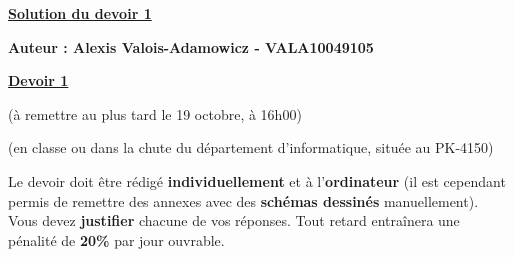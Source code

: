 \documentclass[12pt,addpoints]{exam}
\begin{document}
	
\ifprintanswers
  \vskip 1.2cm
  \centerline{\large\underline{\textbf{Solution du devoir 1}}}
  \vskip 0.5cm
  \begin{mdframed} \begin{center}
  \textbf{Auteur : Alexis Valois-Adamowicz - VALA10049105} \\
  \end{center} \end{mdframed}
  \vskip 0.5cm
\else
  \vskip 1.2cm
  \centerline{\large\underline{\textbf{Devoir 1}}}
  \centerline{\small (à remettre au plus tard le 19 octobre, à 16h00)}
  \centerline{\small (en classe ou dans la chute du département d'informatique, située au PK-4150)}
  \vskip 1.2cm
Le devoir doit être rédigé \textbf{individuellement} et à l'\textbf{ordinateur} (il est cependant permis de remettre des annexes avec des \textbf{schémas dessinés} manuellement). Vous devez \textbf{justifier} chacune de vos réponses. Tout retard entraînera une pénalité de \textbf{20\%} par jour ouvrable.
\fi

\ifprintanswers
\else
\begin{center} \gradetable[h] \end{center}
\fi
\end{document}
